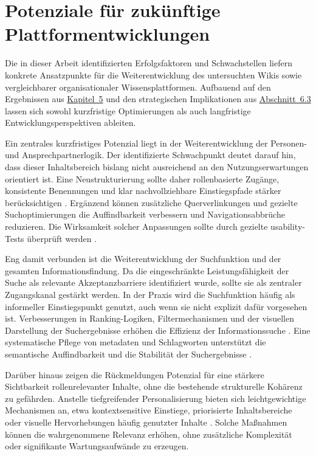\section{Potenziale für zukünftige Plattformentwicklungen}
\label{sec:06-04_future-platform-potential}

Die in dieser Arbeit identifizierten Erfolgsfaktoren und Schwachstellen liefern konkrete Ansatzpunkte für die Weiterentwicklung des untersuchten Wikis sowie vergleichbarer organisationaler Wissensplattformen. Aufbauend auf den Ergebnissen aus \hyperref[ch:05_analysis-and-results]{Kapitel~5} und den strategischen Implikationen aus \hyperref[sec:06-03_organizational-ux-implications]{Abschnitt~6.3} lassen sich sowohl kurzfristige Optimierungen als auch langfristige Entwicklungsperspektiven ableiten.

Ein zentrales kurzfristiges Potenzial liegt in der Weiterentwicklung der Personen- und Ansprechpartnerlogik. Der identifizierte Schwachpunkt deutet darauf hin, dass dieser Inhaltsbereich bislang nicht ausreichend an den Nutzungserwartungen orientiert ist. Eine Neustrukturierung sollte daher rollenbasierte Zugänge, konsistente Benennungen und klar nachvollziehbare Einstiegspfade stärker berücksichtigen \cite{303:Rosenfeld2015,107:NNGRealWorld2024}. Ergänzend können zusätzliche Querverlinkungen und gezielte Suchoptimierungen die Auffindbarkeit verbessern und Navigationsabbrüche reduzieren. Die Wirksamkeit solcher Anpassungen sollte durch gezielte \Gls{usability}-Tests überprüft werden \cite{121:NNGUsabilityTesting}.

Eng damit verbunden ist die Weiterentwicklung der Suchfunktion und der gesamten Informationsfindung. Da die eingeschränkte Leistungsfähigkeit der Suche als relevante Akzeptanzbarriere identifiziert wurde, sollte sie als zentraler Zugangskanal gestärkt werden. In der Praxis wird die Suchfunktion häufig als informeller Einstiegspunkt genutzt, auch wenn sie nicht explizit dafür vorgesehen ist. Verbesserungen in Ranking-Logiken, Filtermechanismen und der visuellen Darstellung der Suchergebnisse erhöhen die Effizienz der Informationssuche \cite{111:NNGSearchVisible,113:NNGIntranetGuidelines}. Eine systematische Pflege von \Gls{metadaten} und Schlagworten unterstützt die semantische Auffindbarkeit und die Stabilität der Suchergebnisse \cite{309:NNGContentGovernance}.

Darüber hinaus zeigen die Rückmeldungen Potenzial für eine stärkere Sichtbarkeit rollenrelevanter Inhalte, ohne die bestehende strukturelle Kohärenz zu gefährden. Anstelle tiefgreifender Personalisierung bieten sich leichtgewichtige Mechanismen an, etwa kontextsensitive Einstiege, priorisierte Inhaltsbereiche oder visuelle Hervorhebungen häufig genutzter Inhalte \cite{308:DWGSegmentation,113:NNGIntranetGuidelines}. Solche Maßnahmen können die wahrgenommene Relevanz erhöhen, ohne zusätzliche Komplexität oder signifikante Wartungsaufwände zu erzeugen.

